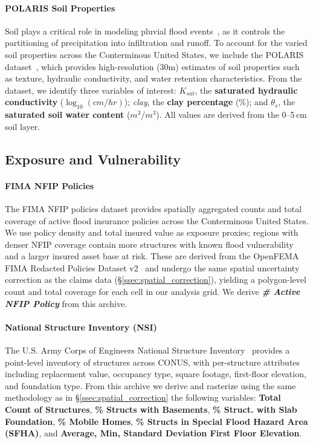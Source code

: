 \paragraph{POLARIS Soil Properties}
Soil plays a critical role in modeling pluvial flood events~\cite{rong_impact_2024}, as it controls the partitioning of precipitation into infiltration and runoff.
%
To account for the varied soil properties across the Conterminous United States, we include the POLARIS dataset~\cite{chaney_polaris_2019}, which provides high-resolution (30m) estimates of soil properties such as texture, hydraulic conductivity, and water retention characteristics.
%
From the dataset, we identify three variables of interest: $K_{sat}$, the \textbf{saturated hydraulic conductivity} (\emph{$\log_{10}(cm/hr)$}); \emph{clay}, the \textbf{clay percentage} (\%); and $\theta_{s}$, the \textbf{saturated soil water content} ($m^3/m^3$).
%
All values are derived from the 0--5\,cm soil layer.

\subsection{Exposure and Vulnerability}
\paragraph{FIMA NFIP Policies}
The FIMA NFIP policies dataset provides spatially aggregated counts and total coverage of active flood insurance policies across the Conterminous United States.
%
We use policy density and total insured value as exposure proxies; regions with denser NFIP coverage contain more structures with known flood vulnerability and a larger insured asset base at risk.
%
These are derived from the OpenFEMA FIMA Redacted Policies Dataset v2~\cite{fema_nfip_policies_v2} and undergo the same spatial uncertainty correction as the claims data (\S\ref{ssec:spatial_correction}), yielding a polygon-level count and total coverage for each cell in our analysis grid.
%
We derive \textbf{\textit{\# Active NFIP Policy}} from this archive.

\paragraph{National Structure Inventory (NSI)}
The U.S. Army Corps of Engineers National Structure Inventory~\cite{usace_nsi_2022} provides a point-level inventory of structures across CONUS, with per-structure attributes including replacement value, occupancy type, square footage, first-floor elevation, and foundation type.
%
From this archive we derive and rasterize using the same methodology as in \S\ref{ssec:spatial_correction} the following variables: \textbf{Total Count of Structures}, \textbf{\% Structs with Basements}, \textbf{\% Struct. with Slab Foundation}, \textbf{\% Mobile Homes}, \textbf{\% Structs in Special Flood Hazard Area (SFHA)}, and \textbf{Average, Min, Standard Deviation First Floor Elevation}.

